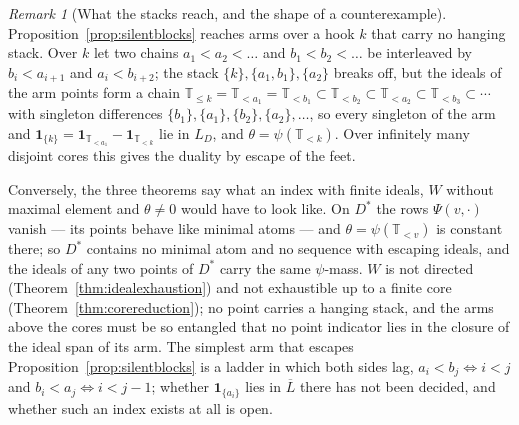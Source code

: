\documentclass[11pt,a4paper]{article}
\theoremstyle{plain}
\theoremstyle{definition}
\theoremstyle{remark}
\newtheorem{remark}[theorem]{Remark}
\newcommand{\T}{\mathbb{T}}                     %
\newcommand{\one}{\mathbf{1}}
\begin{document}
\begin{remark}[What the stacks reach, and the shape of a counterexample]
  \label{rem:stackexhaustion}
  Proposition~\ref{prop:silentblocks} reaches arms over a hook $k$ that carry
  no hanging stack.  Over $k$ let two chains $a_1 < a_2 < \dots$ and
  $b_1 < b_2 < \dots$ be interleaved by $b_i < a_{i+1}$ and $a_i < b_{i+2}$;
  the stack $\{k\}, \{a_1,b_1\}, \{a_2\}$ breaks off, but the ideals of the
  arm points form a chain
  $\T_{\leq k} = \T_{<a_1} = \T_{<b_1} \subset \T_{<b_2} \subset \T_{<a_2}
  \subset \T_{<b_3} \subset \cdots$ with singleton differences
  $\{b_1\}, \{a_1\}, \{b_2\}, \{a_2\}, \dots$, so every singleton of the arm
  and $\one_{\{k\}} = \one_{\T_{<a_1}} - \one_{\T_{<k}}$ lie in $L_D$, and
  $\theta = \psi(\T_{<k})$.  Over infinitely many disjoint cores this gives
  the duality by escape of the feet.

  Conversely, the three theorems say what an index with finite ideals, $W$
  without maximal element and $\theta \neq 0$ would have to look like.  On
  $D^*$ the rows $\Psi(v,\cdot)$ vanish --- its points behave like minimal
  atoms --- and $\theta = \psi(\T_{<v})$ is constant there; so $D^*$ contains
  no minimal atom and no sequence with escaping ideals, and the ideals of any
  two points of $D^*$ carry the same $\psi$-mass.  $W$ is not directed
  (Theorem~\ref{thm:idealexhaustion}) and not exhaustible up to a finite core
  (Theorem~\ref{thm:corereduction}); no point carries a hanging stack, and
  the arms above the cores must be so entangled that no point indicator lies
  in the closure of the ideal span of its arm.  The simplest arm that escapes
  Proposition~\ref{prop:silentblocks} is a ladder in which both sides lag,
  $a_i < b_j \iff i < j$ and $b_i < a_j \iff i < j-1$; whether
  $\one_{\{a_i\}}$ lies in $\overline{L}$ there has not been decided, and
  whether such an index exists at all is open.
\end{remark}
\end{document}
